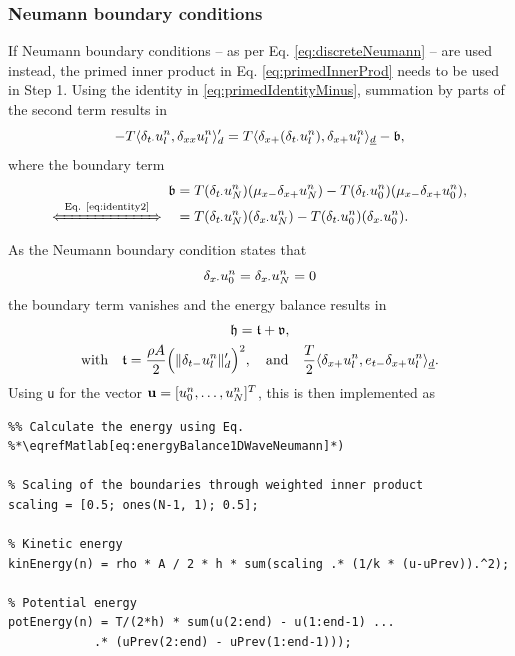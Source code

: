 {{\subsubsection{Neumann boundary conditions}
If Neumann boundary conditions -- as per Eq. \eqref{eq:discreteNeumann} -- are used instead, the primed inner product in Eq. \eqref{eq:primedInnerProd} needs to be used in Step 1. Using the identity in \eqref{eq:primedIdentityMinus}, summation by parts of the second term results in
\begin{equation*}
    - T \langle \delta_{t\cdot}u_l^n, \delta_{xx} u_l^n\rangle_d'  = T\langle \delta_{x+}(\delta_{t\cdot}u_l^n), \delta_{x+}u_l^n\rangle_{\underline{d}} - \mathfrak{b},
\end{equation*}
where the boundary term
\begin{align*}
    \mathfrak{b} &= T(\dtd u_N^n)(\mxm\dxp u_N^n) - T(\dtd u_0^n) (\mxm \dxp u_0^n),\\[-1em]
    \xLeftrightarrow{\mystrut\ \text{Eq. \eqref{eq:identity2}}\ } \quad &= T(\dtd u_N^n)(\dxd u_N^n) - T(\dtd u_0^n) (\dxd u_0^n).
\end{align*}
As the Neumann boundary condition states that
\begin{equation*}
    \delta_{x\cdot} u_0^n = \delta_{x\cdot} u_N^n = 0
\end{equation*}
the boundary term vanishes and the energy balance results in
%
\begin{equation}\label{eq:energyBalance1DWaveNeumann}
    \begin{gathered}
        \mathfrak{h} = \mathfrak{t} + \mathfrak{v},\\
        \text{with}\quad \mathfrak{t} = \frac{\rho A}{2}\Big(\lVert \delta_{t-} u_l^n \rVert'_d\Big)^2, \quad \text{and} \quad \frac{T}{2}\langle\delta_{x+}u_l^n, e_{t-}\delta_{x+}u_l^n\rangle_{\underline{d}}.
    \end{gathered}
\end{equation}
Using \texttt{u} for the vector $\mathbf{u} = [u_0^n, \hdots, u_N^n]^T$, this is then implemented as

\setlstMAT
\begin{lstlisting}
%% Calculate the energy using Eq. %*\eqrefMatlab[eq:energyBalance1DWaveNeumann]*) 

% Scaling of the boundaries through weighted inner product
scaling = [0.5; ones(N-1, 1); 0.5];

% Kinetic energy
kinEnergy(n) = rho * A / 2 * h * sum(scaling .* (1/k * (u-uPrev)).^2);

% Potential energy
potEnergy(n) = T/(2*h) * sum(u(2:end) - u(1:end-1) ...
            .* (uPrev(2:end) - uPrev(1:end-1)));


\end{lstlisting}}}
